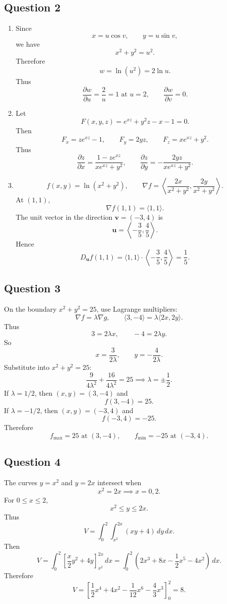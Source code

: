 \documentclass[11pt]{article}
\begin{document}
\subsection*{Question 2}
\begin{enumerate}[label=\alph*)]
\item
Since
\[
x=u\cos v,\qquad y=u\sin v,
\]
we have
\[
x^2+y^2=u^2.
\]
Therefore
\[
w=\ln(u^2)=2\ln u.
\]
Thus
\[
\boxed{\frac{\partial w}{\partial u}=\frac2u=1\text{ at }u=2},
\qquad
\boxed{\frac{\partial w}{\partial v}=0}.
\]

\item
Let
\[
F(x,y,z)=e^{xz}+y^2z-x-1=0.
\]
Then
\[
F_x=ze^{xz}-1,\qquad F_y=2yz,\qquad F_z=xe^{xz}+y^2.
\]
Thus
\[
\boxed{\frac{\partial z}{\partial x}=\frac{1-ze^{xz}}{xe^{xz}+y^2}},
\qquad
\boxed{\frac{\partial z}{\partial y}=-\frac{2yz}{xe^{xz}+y^2}}.
\]

\item
\[
f(x,y)=\ln(x^2+y^2),\qquad
\nabla f=\left\langle \frac{2x}{x^2+y^2},\frac{2y}{x^2+y^2}\right\rangle.
\]
At $(1,1)$,
\[
\nabla f(1,1)=\langle 1,1\rangle.
\]
The unit vector in the direction $\mathbf v=(-3,4)$ is
\[
\mathbf u=\left\langle -\frac35,\frac45\right\rangle.
\]
Hence
\[
D_{\mathbf u}f(1,1)=\langle 1,1\rangle\cdot\left\langle -\frac35,\frac45\right\rangle
=\boxed{\frac15}.
\]
\end{enumerate}

\subsection*{Question 3}
On the boundary $x^2+y^2=25$, use Lagrange multipliers:
\[
\nabla f=\lambda\nabla g,
\qquad
\langle 3,-4\rangle=\lambda\langle 2x,2y\rangle.
\]
Thus
\[
3=2\lambda x,\qquad -4=2\lambda y.
\]
So
\[
x=\frac3{2\lambda},\qquad y=-\frac4{2\lambda}.
\]
Substitute into $x^2+y^2=25$:
\[
\frac9{4\lambda^2}+\frac{16}{4\lambda^2}=25
\implies
\lambda=\pm\frac12.
\]
If $\lambda=1/2$, then $(x,y)=(3,-4)$ and
\[
f(3,-4)=25.
\]
If $\lambda=-1/2$, then $(x,y)=(-3,4)$ and
\[
f(-3,4)=-25.
\]
Therefore
\[
\boxed{f_{\max}=25\text{ at }(3,-4)},\qquad
\boxed{f_{\min}=-25\text{ at }(-3,4)}.
\]

\subsection*{Question 4}
The curves $y=x^2$ and $y=2x$ intersect when
\[
x^2=2x \implies x=0,2.
\]
For $0\le x\le 2$,
\[
x^2\le y\le 2x.
\]
Thus
\[
V=\int_0^2\int_{x^2}^{2x}(xy+4)\,dy\,dx.
\]
Then
\[
V=\int_0^2\left[\frac{x}{2}y^2+4y\right]_{x^2}^{2x}\,dx
=\int_0^2\left(2x^3+8x-\frac12x^5-4x^2\right)\,dx.
\]
Therefore
\[
V=\left[\frac12x^4+4x^2-\frac1{12}x^6-\frac43x^3\right]_0^2
=\boxed{8}.
\]
\end{document}
